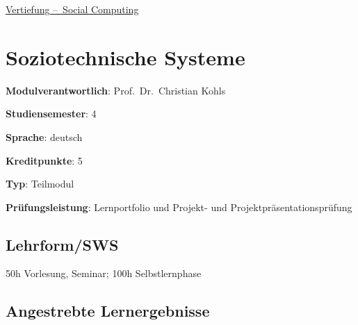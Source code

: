 \hyperref[/mi-2017/modulbeschreibungen-bachelor/BA_Vertiefung_SocialComputing]{Vertiefung – Social Computing}

\hypertarget{soziotechnische-systemepathlabelmi-2017modulbeschreibungen-bachelorba_sc_soziotechnische-systeme}{%
\chapter{Soziotechnische
Systeme\label{/mi-2017/modulbeschreibungen-bachelor/BA_SC_soziotechnische-systeme}}\label{soziotechnische-systemepathlabelmi-2017modulbeschreibungen-bachelorba_sc_soziotechnische-systeme}}

\begin{modulHead}
\textbf{Modulverantwortlich}: Prof.~Dr.~Christian
Kohls
\end{modulHead}
\begin{modulHead}
\textbf{Studiensemester}:
4
\end{modulHead}
\begin{modulHead}
\textbf{Sprache}:
deutsch
\end{modulHead}
\begin{modulHead}
\textbf{Kreditpunkte}:
5
\end{modulHead}
\begin{modulHead}
\textbf{Typ}:
Teilmodul
\end{modulHead}
\begin{modulHead}
\textbf{Prüfungsleistung}:
Lernportfolio und Projekt- und
Projektpräsentationsprüfung
\end{modulHead}


\hypertarget{lehrformswspathlabelmi-2017modulbeschreibungen-bachelorba_sc_soziotechnische-systeme}{%
\section*{Lehrform/SWS\label{/mi-2017/modulbeschreibungen-bachelor/BA_SC_soziotechnische-systeme}}\label{lehrformswspathlabelmi-2017modulbeschreibungen-bachelorba_sc_soziotechnische-systeme}}

50h Vorlesung, Seminar; 100h Selbstlernphase

\hypertarget{angestrebte-lernergebnissepathlabelmi-2017modulbeschreibungen-bachelorba_sc_soziotechnische-systeme}{%
\section*{Angestrebte
Lernergebnisse\label{/mi-2017/modulbeschreibungen-bachelor/BA_SC_soziotechnische-systeme}}\label{angestrebte-lernergebnissepathlabelmi-2017modulbeschreibungen-bachelorba_sc_soziotechnische-systeme}}


